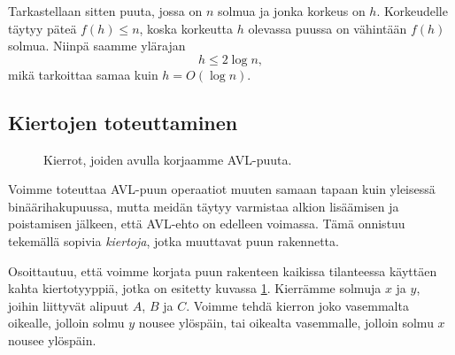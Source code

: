 Tarkastellaan sitten puuta, jossa on $n$ solmua
ja jonka korkeus on $h$.
Korkeudelle täytyy päteä $f(h) \le n$,
koska korkeutta $h$ olevassa puussa on vähintään $f(h)$ solmua.
Niinpä saamme ylärajan
\[h \le 2 \log n,\]
mikä tarkoittaa samaa kuin $h = O(\log n)$.

\subsection{Kiertojen toteuttaminen}

\begin{figure}
\center
{}
\caption{Kierrot, joiden avulla korjaamme AVL-puuta.}
\label{fig:avlkie}
\end{figure}


Voimme toteuttaa AVL-puun operaatiot muuten samaan tapaan
kuin yleisessä binäärihakupuussa, mutta meidän täytyy varmistaa
alkion lisäämisen ja poistamisen jälkeen, että AVL-ehto
on edelleen voimassa.
Tämä onnistuu tekemällä sopivia \emph{kiertoja},
jotka muuttavat puun rakennetta.

Osoittautuu, että voimme korjata puun rakenteen kaikissa
tilanteessa käyttäen kahta kiertotyyppiä,
jotka on esitetty kuvassa \ref{fig:avlkie}.
Kierrämme solmuja $x$ ja $y$,
joihin liittyvät alipuut $A$, $B$ ja $C$.
Voimme tehdä kierron joko vasemmalta oikealle,
jolloin solmu $y$ nousee ylöspäin,
tai oikealta vasemmalle,
jolloin solmu $x$ nousee ylöspäin.

